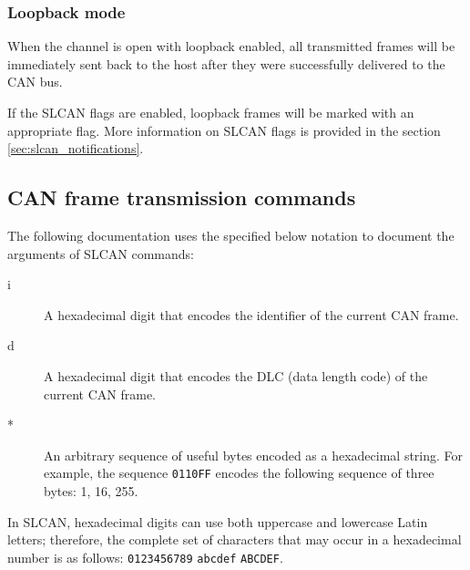 \documentclass{zubaxdoc}
\begin{document}
\subsubsection{Loopback mode}\label{sec:slcan_loopback_mode}

When the channel is open with loopback enabled,
all transmitted frames will be immediately sent back to the host
after they were successfully delivered to the CAN bus.

If the SLCAN flags are enabled, loopback frames will be marked with an appropriate flag.
More information on SLCAN flags is provided in the section \ref{sec:slcan_notifications}.

\subsection{CAN frame transmission commands}

The following documentation uses the specified below notation to document the arguments of SLCAN commands:
\begin{description}
    \item[i] A hexadecimal digit that encodes the identifier of the current CAN frame.
    \item[d] A hexadecimal digit that encodes the DLC (data length code) of the current CAN frame.
    \item[*] An arbitrary sequence of useful bytes encoded as a hexadecimal string.
             For example, the sequence \verb|0110FF| encodes the following sequence of three bytes:
             1, 16, 255.
\end{description}

In SLCAN, hexadecimal digits can use both uppercase and lowercase Latin letters;
therefore, the complete set of characters that may occur in a hexadecimal number is as follows:
\verb|0123456789| \verb|abcdef| \verb|ABCDEF|.
\end{document}
